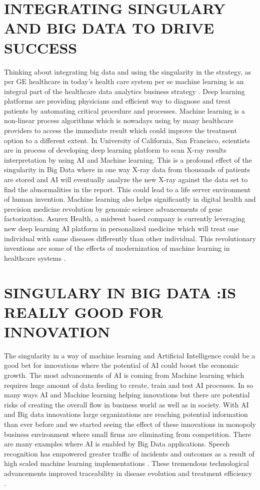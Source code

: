 \documentclass[sigconf]{acmart}
\begin{document}
\section{INTEGRATING SINGULARY AND BIG DATA TO DRIVE SUCCESS}
Thinking about integrating big data and using the singularity in the strategy, as per GE healthcare in today’s health care system per se machine learning is an integral part of the healthcare data analytics business strategy \cite{editor02}. Deep learning platforms are providing physicians and efficient way to diagnose and treat patients by automating critical procedure and processes. Machine learning is a non-linear process algorithms which is nowadays using by many healthcare providers to access the immediate result which could improve the treatment option to a different extent. In University of California, San Francisco, scientists are in process of developing deep learning platform to scan X-ray results interpretation by using AI and Machine learning. This is a profound effect of the singularity in Big Data where in one way X-ray data from thousands of patients are stored and AI will eventually analyze the new X-ray against the data set to find the abnormalities in the report. This could lead to a life server environment of human invention. Machine learning also helps significantly in digital health and precision medicine revolution by genomic science advancements of gene factorization. Asurex Health, a midwest based company is currently leveraging new deep learning AI platform in personalized medicine which will treat one individual with same diseases differently than other individual. This revolutionary inventions are some of the effects of modernization of machine learning in healthcare systems \cite{editor02}.

\section{SINGULARY IN BIG DATA :IS REALLY GOOD FOR INNOVATION}
The singularity in a way of machine learning and Artificial Intelligence could be a good bet for innovations where the potential of AI could boost the economic growth. The most advancements of AI is coming from Machine learning which requires huge amount of data feeding to create, train and test AI processes. In so many ways AI and Machine learning helping innovations but there are potential risks of creating the overall flow in business world as well as in society. With AI and Big data innovations large organizations are reaching potential information than ever before and we started seeing the effect of these innovations in monopoly business environment where small firms are eliminating from competition. There are many examples where AI is enabled by Big Data applications. Speech recognition  has empowered greater traffic of incidents and outcomes as a result of high scaled machine learning implementations \cite{editor03}. These tremendous technological advancements improved traceability in disease evolution and treatment efficiency \cite{editor03}.
\end{document}
